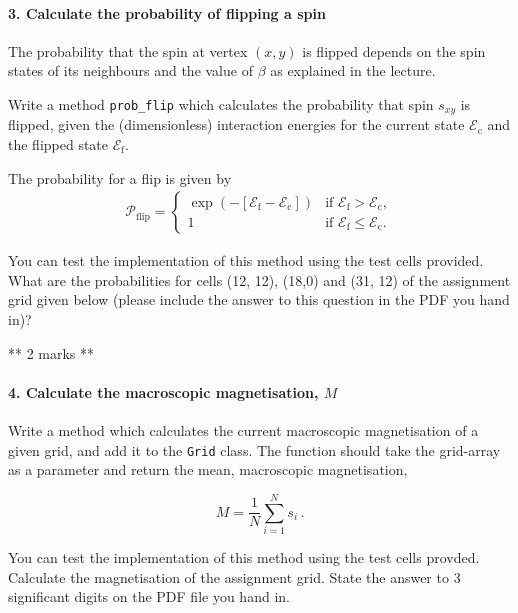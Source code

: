 \documentclass[11pt]{article}
\begin{document}
    \hypertarget{calculate-the-probability-of-flipping-a-spin}{%
\paragraph{3. Calculate the probability of flipping a
spin}\label{calculate-the-probability-of-flipping-a-spin}}

The probability that the spin at vertex \((x,y)\) is flipped depends on
the spin states of its neighbours and the value of \(\beta\) as
explained in the lecture.

Write a method \texttt{prob\_flip} which calculates the probability that
spin \(s_{xy}\) is flipped, given the (dimensionless) interaction
energies for the current state \(\mathcal{E}_\mathrm{c}\) and the
flipped state \(\mathcal{E}_\mathrm{f}\).

The probability for a flip is given by \begin{align}
\mathcal{P}_\mathrm{flip} = 
\begin{cases}
\exp\left(-\left[\mathcal{E}_\mathrm{f} - \mathcal{E}_\mathrm{c}\right]\right) & \text{if } \mathcal{E}_\mathrm{f} > \mathcal{E}_\mathrm{c}, \\
1 & \text{if } \mathcal{E}_\mathrm{f} \leq \mathcal{E}_\mathrm{c}.
\end{cases}
\end{align}

You can test the implementation of this method using the test cells
provided. What are the probabilities for cells (12, 12), (18,0) and (31,
12) of the assignment grid given below (please include the answer to
this question in the PDF you hand in)?

** 2 marks **

    \hypertarget{calculate-the-macroscopic-magnetisation-m}{%
\paragraph{\texorpdfstring{4. Calculate the macroscopic magnetisation,
\(M\)}{4. Calculate the macroscopic magnetisation, M}}\label{calculate-the-macroscopic-magnetisation-m}}

Write a method which calculates the current macroscopic magnetisation of
a given grid, and add it to the \texttt{Grid} class. The function should
take the grid-array as a parameter and return the mean, macroscopic
magnetisation,

\[ M=\frac{1}{N}\sum_{i=1}^N s_i\,.\]

You can test the implementation of this method using the test cells
provded. Calculate the magnetisation of the assignment grid. State the
answer to 3 significant digits on the PDF file you hand in.
\end{document}
